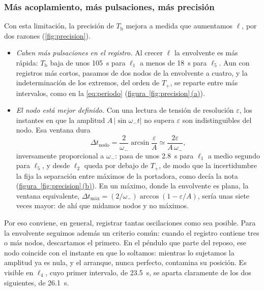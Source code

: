 \documentclass[a4paper,11pt]{amsart}
\numberwithin{equation}{section}
\newcommand{\Tb}{T_{\mathrm{b}}}              %
\newcommand{\Tp}{T_{+}}                       %
\newcommand{\wm}{\omega_{-}}                  %
\theoremstyle{cienplano}
\theoremstyle{ciendef}
\theoremstyle{cienobs}
\newcommand{\figpanel}[2]{\hyperref[#1]{figura~\ref*{#1}\,\textup{(#2)}}}
\begin{document}
\subsubsection{Más acoplamiento, más pulsaciones, más precisión}
Con esta limitación, la precisión de $\Tb$ mejora a medida que aumentamos
$\ell$, por dos razones (\cref{fig:precision}).
\begin{itemize}
  \item \emph{Caben más pulsaciones en el registro.} Al crecer $\ell$ la
        envolvente es más rápida: $\Tb$ baja de unos \SI{105}{\second} para
        $\ell_1$ a menos de \SI{18}{\second} para $\ell_5$. Aun con registros
        más cortos, pasamos de dos nodos de la envolvente a cuatro, y la
        indeterminación de los extremos, del orden de $\Tp$, se reparte entre
        más intervalos, como en la \cref{eq:periodo}
        (\figpanel{fig:precision}{a}).
  \item \emph{El nodo está mejor definido.} Con una lectura de tensión de
        resolución $\varepsilon$, los instantes en que la amplitud
        $A\,|\sin\wm t|$ no supera $\varepsilon$ son indistinguibles del
        nodo. Esa ventana dura
        \begin{equation}\label{eq:ventana}
          \Delta t_{\text{nodo}}=\frac{2}{\wm}\arcsin\frac{\varepsilon}{A}
          \simeq\frac{2\varepsilon}{A\,\wm},
        \end{equation}
        inversamente proporcional a $\wm$: pasa de unos \SI{2,8}{\second}
        para $\ell_1$ a medio segundo para $\ell_5$, y desde $\ell_2$ queda
        por debajo de $\Tp$, de modo que la incertidumbre la fija la
        separación entre máximos de la portadora, como decía la nota
        (\figpanel{fig:precision}{b}). En un máximo, donde la envolvente es
        plana, la ventana equivalente,
        $\Delta t_{\text{máx}}=(2/\wm)\arccos(1-\varepsilon/A)$, sería unas
        siete veces mayor: de ahí que midamos nodos y no máximos.
\end{itemize}
Por eso conviene, en general, registrar tantas oscilaciones como sea
posible. Para la envolvente seguimos además un criterio común: cuando el
registro contiene tres o más nodos, descartamos el primero. En el péndulo que
parte del reposo, ese nodo coincide con el instante en que lo soltamos:
mientras lo sujetamos la amplitud ya es nula, y el arranque, nunca perfecto,
contamina su posición. Es visible en $\ell_4$, cuyo primer intervalo, de
\SI{23,5}{\second}, se aparta claramente de los dos siguientes, de
\SI{26,1}{\second}.
\end{document}
